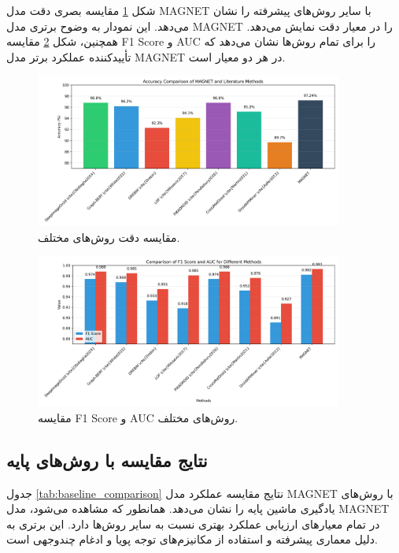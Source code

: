 شکل \ref{fig:literature_comparison_accuracy} مقایسه بصری دقت مدل MAGNET با سایر روش‌های پیشرفته را نشان می‌دهد. این نمودار به وضوح برتری مدل MAGNET را در معیار دقت نمایش می‌دهد. همچنین، شکل \ref{fig:literature_comparison_metrics} مقایسه F1 Score و AUC را برای تمام روش‌ها نشان می‌دهد که تأییدکننده عملکرد برتر مدل MAGNET در هر دو معیار است.

\begin{figure}[h!]
    \centering
    \includegraphics[width=0.9\textwidth]{images/fig_literature_comparison_accuracy}
    \caption{مقایسه دقت روش‌های مختلف.}
    \label{fig:literature_comparison_accuracy}
\end{figure}

\begin{figure}[h!]
    \centering
    \includegraphics[width=0.9\textwidth]{images/fig_literature_comparison_metrics}
    \caption{مقایسه F1 Score و AUC روش‌های مختلف.}
    \label{fig:literature_comparison_metrics}
\end{figure}

\subsection{نتایج مقایسه با روش‌های پایه}
جدول \ref{tab:baseline_comparison} نتایج مقایسه عملکرد مدل MAGNET با روش‌های یادگیری ماشین پایه را نشان می‌دهد. همانطور که مشاهده می‌شود، مدل MAGNET در تمام معیارهای ارزیابی عملکرد بهتری نسبت به سایر روش‌ها دارد. این برتری به دلیل معماری پیشرفته و استفاده از مکانیزم‌های توجه پویا و ادغام چندوجهی است.


